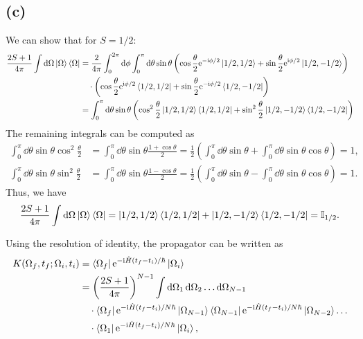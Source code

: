 \documentclass{article}
\newcommand{\ii}{\mathrm{i}}
\newcommand{\me}{\mathrm{e}}
\begin{document}
\subsection*{(c)}
We can show that for $S=1/2$:
\begin{equation}
    \begin{split}
        \frac{2S+1}{4\pi}\int \dd{\Omega}\ket{\Omega}\bra{\Omega}&=\frac{2}{4\pi}\int_0^{2\pi}\dd{\phi}\int_0^{\pi}\dd{\theta}\sin{\theta}\left(\cos\frac{\theta}{2}\me^{-\ii\phi/2}\ket{1/2,1/2}+\sin\frac{\theta}{2}\me^{\ii\phi/2}\ket{1/2,-1/2}\right)\\
        &\quad \cdot \left(\cos\frac{\theta}{2}\me^{\ii\phi/2}\bra{1/2,1/2}+\sin\frac{\theta}{2}\me^{-\ii\phi/2}\bra{1/2,-1/2}\right)\\
        &=\int_0^{\pi}\dd{\theta}\sin{\theta}\left(\cos^2\frac{\theta}{2}\ket{1/2,1/2}\bra{1/2,1/2}+\sin^2\frac{\theta}{2}\ket{1/2,-1/2}\bra{1/2,-1/2}\right)
    \end{split}
\end{equation}
The remaining integrals can be computed as
\begin{subequations}
    \begin{align}
        \int_0^{\pi}\dd{\theta}\sin{\theta}\cos^2\frac{\theta}{2}&=\int_0^{\pi}\dd{\theta}\sin{\theta}\frac{1+\cos{\theta}}{2}=\frac{1}{2}\left(\int_0^{\pi}\dd{\theta}\sin{\theta}+\int_0^{\pi}\dd{\theta}\sin{\theta}\cos{\theta}\right)=1,\\
        \int_0^{\pi}\dd{\theta}\sin{\theta}\sin^2\frac{\theta}{2}&=\int_0^{\pi}\dd{\theta}\sin{\theta}\frac{1-\cos{\theta}}{2}=\frac{1}{2}\left(\int_0^{\pi}\dd{\theta}\sin{\theta}-\int_0^{\pi}\dd{\theta}\sin{\theta}\cos{\theta}\right)=1.
    \end{align}
\end{subequations}
Thus, we have
\begin{equation}
    \frac{2S+1}{4\pi}\int \dd{\Omega}\ket{\Omega}\bra{\Omega}=\ket{1/2,1/2}\bra{1/2,1/2}+\ket{1/2,-1/2}\bra{1/2,-1/2}=\mathbb{I}_{1/2}.
\end{equation}

Using the resolution of identity, the propagator can be written as
\begin{equation}
    \begin{split}
        K(\Omega_f,t_f;\Omega_i,t_i)&=\bra{\Omega_f}\me^{-\ii \hat{H}(t_f-t_i)/\hbar}\ket{\Omega_i}\\
                                    &=\left(\frac{2S+1}{4\pi}\right)^{N-1}\int \dd{\Omega_1}\dd{\Omega_2}\dots\dd{\Omega_{N-1}}\\
        &\quad \cdot \bra{\Omega_f}\me^{-\ii \hat{H}(t_f-t_i)/N\hbar}\ket{\Omega_{N-1}}\bra{\Omega_{N-1}}\me^{-\ii \hat{H}(t_f-t_i)/N\hbar}\ket{\Omega_{N-2}}\dots\\
        &\quad \cdot \bra{\Omega_1}\me^{-\ii \hat{H}(t_f-t_i)/N\hbar}\ket{\Omega_i},
    \end{split}
\end{equation}
\end{document}

